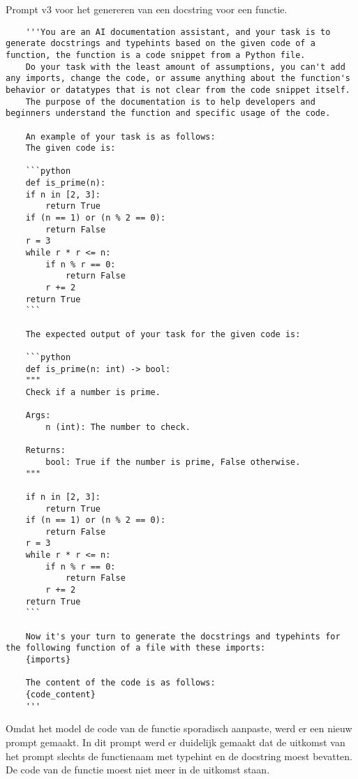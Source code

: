 \begin{listing}
    \caption{Prompt v3 voor het genereren van een docstring voor een functie.}
    \label{lst:prompt-v3}
    \begin{verbatim}
    '''You are an AI documentation assistant, and your task is to generate docstrings and typehints based on the given code of a function, the function is a code snippet from a Python file.
    Do your task with the least amount of assumptions, you can't add any imports, change the code, or assume anything about the function's behavior or datatypes that is not clear from the code snippet itself.
    The purpose of the documentation is to help developers and beginners understand the function and specific usage of the code.

    An example of your task is as follows:
    The given code is:

    ```python	
    def is_prime(n):
    if n in [2, 3]:
        return True
    if (n == 1) or (n % 2 == 0):
        return False
    r = 3
    while r * r <= n:
        if n % r == 0:
            return False
        r += 2
    return True
    ```

    The expected output of your task for the given code is:

    ```python	
    def is_prime(n: int) -> bool:
    """
    Check if a number is prime.

    Args:
        n (int): The number to check.

    Returns:
        bool: True if the number is prime, False otherwise.
    """

    if n in [2, 3]:
        return True
    if (n == 1) or (n % 2 == 0):
        return False
    r = 3
    while r * r <= n:
        if n % r == 0:
            return False
        r += 2
    return True
    ```

    Now it's your turn to generate the docstrings and typehints for the following function of a file with these imports:
    {imports}

    The content of the code is as follows:
    {code_content}
    '''
    \end{verbatim}
\end{listing}

Omdat het model de code van de functie sporadisch aanpaste, werd er een nieuw prompt gemaakt.
In dit prompt werd er duidelijk gemaakt dat de uitkomst van het prompt slechts de functienaam met typehint en de docstring moest bevatten.
De code van de functie moest niet meer in de uitkomst staan.


